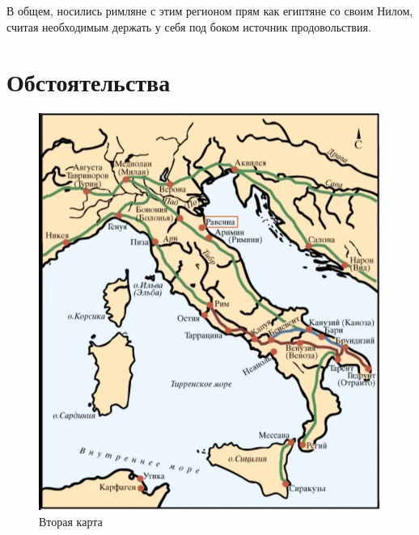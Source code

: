 В общем, носились римляне с этим регионом прям как египтяне со своим Нилом, считая необходимым держать у себя под боком источник продовольствия.




\section{Обстоятельства}
\begin{figure}[h!tb]
	\centering\includegraphics[scale=0.4]{Data/antic_technocrash/1614663828122115735.jpg}
	\caption{Вторая карта
	}
	\label{fig:tech2} %
\end{figure}

